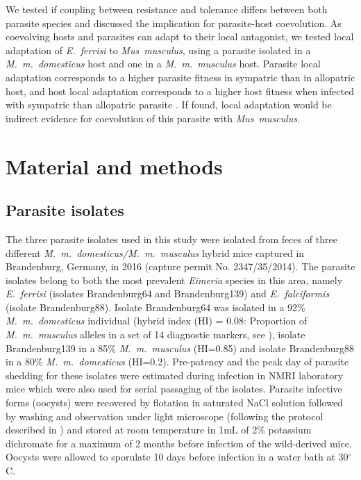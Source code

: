 \documentclass[12pt]{article}
\begin{document}
\par
We tested if coupling between resistance and tolerance differs between both parasite species and discussed the implication for parasite-host coevolution. As coevolving hosts and parasites can adapt to their local antagonist, we tested local adaptation of \textit{E.~ferrisi} to \textit{Mus~musculus}, using a parasite isolated in a \textit{M.~m.~domesticus} host and one in a \textit{M.~m.~musculus} host. Parasite local adaptation corresponds to a higher parasite fitness in sympatric than in allopatric host, and host local adaptation corresponds to a higher host fitness when infected with sympatric than allopatric parasite \citep{schulte_host_2011}. If found, local adaptation would be indirect evidence for coevolution of this parasite with \textit{Mus~musculus}.

\section*{Material and methods}

\subsection{Parasite isolates}

The three parasite isolates used in this study were isolated from feces of three different \textit{M.~m.~domesticus/M.~m.~musculus} hybrid mice captured in Brandenburg, Germany, in 2016 (capture permit No. 2347/35/2014). The parasite isolates belong to both the most prevalent \textit{Eimeria }species in this area, namely \textit{E.~ferrisi }(isolates Brandenburg64 and Brandenburg139) and \textit{E.~falciformis }(isolate Brandenburg88)\citep{jarquin-diaz_detection_2019}. Isolate Brandenburg64 was isolated in a 92\% \textit{M.~m.~domesticus} individual (hybrid index (HI) = 0.08: Proportion of \textit{M.~m.~musculus} alleles in a set of 14 diagnostic markers, see \cite{Balard2020}), isolate Brandenburg139 in a 85\% \textit{M.~m.~musculus} (HI=0.85) and isolate Brandenburg88 in a 80\% \textit{M.~m.~domesticus} (HI=0.2). Pre-patency and the peak day of parasite shedding for these isolates were estimated during infection in NMRI laboratory mice \citep{al-khlifeh_eimeria_2019} which were also used for serial passaging of the isolates. Parasite infective forms (oocysts) were recovered by flotation in saturated NaCl solution followed by washing and observation under light microscope (following the protocol described in \cite{clerc_parasitic_2019}) and stored at room temperature in 1mL of 2\% potassium dichromate for a maximum of 2 months before infection of the wild-derived mice. Oocysts were allowed to sporulate 10 days before infection in a water bath at 30$^{\circ}$C.\par
\end{document}
